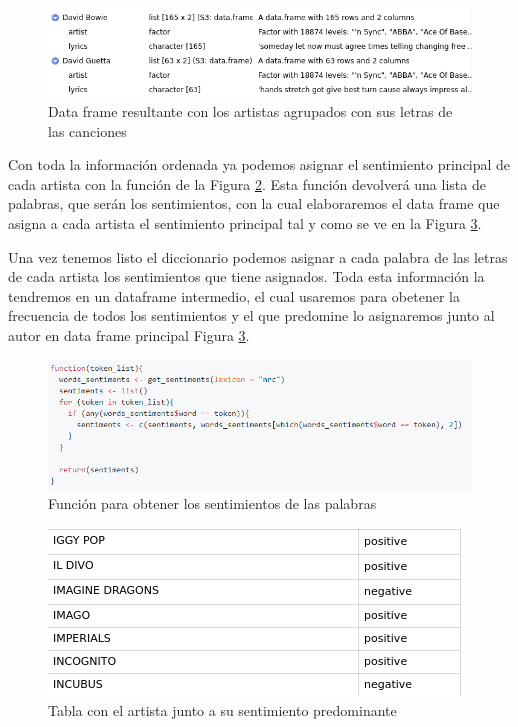 \begin{figure}[h]
	\centering
	\includegraphics[width=0.9\linewidth]{Imagenes/artistlyrics-dataframe}
	\caption{Data frame resultante con los artistas agrupados con sus letras de las canciones}
	\label{fig:artistlyrics-dataframe}
\end{figure}

Con toda la información ordenada ya podemos asignar el sentimiento principal de cada artista con la función de la Figura \ref{fig:lista-sentimientos}. Esta función devolverá una lista de palabras, que serán los sentimientos, con la cual elaboraremos el data frame que asigna a cada artista el sentimiento principal tal y como se ve en la Figura \ref{fig:artista-sentimiento}.

Una vez tenemos listo el diccionario podemos asignar a cada palabra de las letras de cada artista los sentimientos que tiene asignados. Toda esta información la tendremos en un dataframe intermedio, el cual usaremos para obetener la frecuencia de todos los sentimientos y el que predomine lo asignaremos junto al autor en data frame principal Figura \ref{fig:artista-sentimiento}.

\begin{figure}[h]
	\centering
	\includegraphics[width=\linewidth]{Imagenes/lista-sentimientos}
	\caption{Función para obtener los sentimientos de las palabras}
	\label{fig:lista-sentimientos}
\end{figure}

\begin{figure}[h]
	\centering
	\includegraphics[width=0.7\linewidth]{Imagenes/artista-sentimiento}
	\caption{Tabla con el artista junto a su sentimiento predominante}
	\label{fig:artista-sentimiento}
\end{figure}


